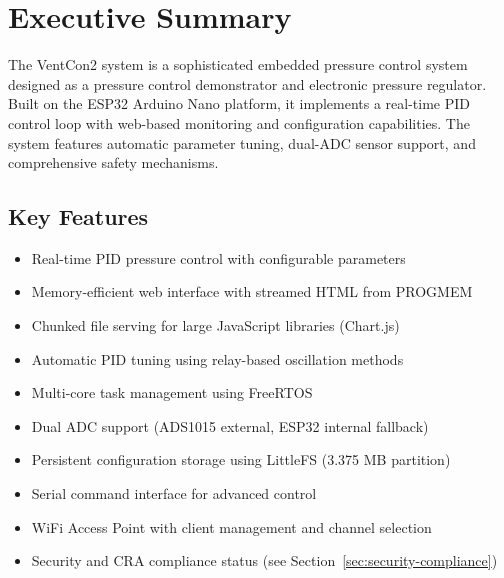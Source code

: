 
\section{Executive Summary}

The VentCon2 system is a sophisticated embedded pressure control system designed as a pressure control demonstrator and electronic pressure regulator. Built on the ESP32 Arduino Nano platform, it implements a real-time PID control loop with web-based monitoring and configuration capabilities. The system features automatic parameter tuning, dual-ADC sensor support, and comprehensive safety mechanisms.

\subsection{Key Features}
\begin{itemize}
    \item Real-time PID pressure control with configurable parameters
    \item Memory-efficient web interface with streamed HTML from PROGMEM
    \item Chunked file serving for large JavaScript libraries (Chart.js)
    \item Automatic PID tuning using relay-based oscillation methods
    \item Multi-core task management using FreeRTOS
    \item Dual ADC support (ADS1015 external, ESP32 internal fallback)
    \item Persistent configuration storage using LittleFS (3.375 MB partition)
    \item Serial command interface for advanced control
    \item WiFi Access Point with client management and channel selection
    \item Security and CRA compliance status (see Section~\ref{sec:security-compliance})
\end{itemize}
